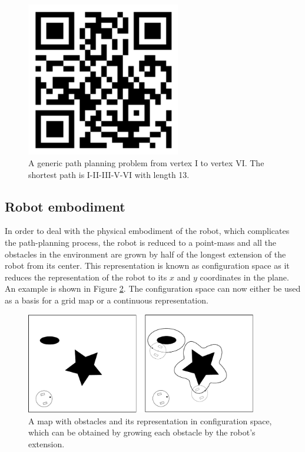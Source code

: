 \begin{figure}[!htb]
\centering
\includegraphics[width=0.6\textwidth]{figs/dijkstra}
\caption{A generic path planning problem from vertex I to vertex VI. The shortest path is I-II-III-V-VI with length 13. \label{fig:pathproblem}}
\end{figure}

\subsection{Robot embodiment}
In order to deal with the physical embodiment of the robot, which complicates the path-planning process, the robot is reduced to a point-mass and all the obstacles in the environment are grown by half of the longest extension of the robot from its center. This representation is known as configuration space as it reduces the representation of the robot to its $x$ and $y$ coordinates in the plane. An example is shown in Figure \ref{fig:cspace}. The configuration space can now either be used as a basis for a grid map or a continuous representation.

\begin{figure}[!htb]
\centering
\includegraphics[width=0.9\textwidth]{figs/configurationspace}
\caption{A map with obstacles and its representation in configuration space, which can be obtained by growing each obstacle by the robot's extension. \label{fig:cspace}}
\end{figure}


